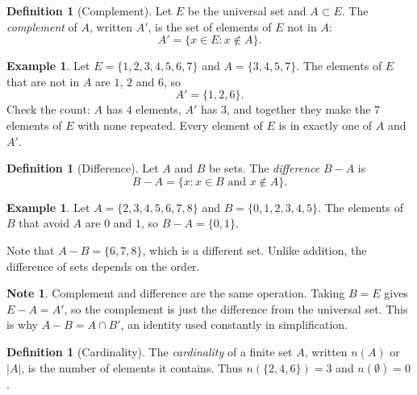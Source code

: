\documentclass[11pt,a4paper]{article}
\theoremstyle{definition}
\newtheorem{definition}[thm]{Definition}
\newtheorem{example}[thm]{Example}
\newtheorem{note}[thm]{Note}
\begin{document}
\begin{figure}[H]
\centering
{}
\end{figure}

\begin{definition}[Complement]
Let $E$ be the universal set and $A\subset E$. The \emph{complement} of $A$,
written $A'$, is the set of elements of $E$ not in $A$:
$$A'=\{x\in E : x\notin A\}.$$
\end{definition}

\begin{example}
Let $E=\{1,2,3,4,5,6,7\}$ and $A=\{3,4,5,7\}$. The elements of $E$ that are not in
$A$ are $1$, $2$ and $6$, so
$$A'=\{1,2,6\}.$$
Check the count: $A$ has $4$ elements, $A'$ has $3$, and together they make the
$7$ elements of $E$ with none repeated. Every element of $E$ is in exactly one of
$A$ and $A'$.
\end{example}

\begin{definition}[Difference]
Let $A$ and $B$ be sets. The \emph{difference} $B-A$ is
$$B-A=\{x : x\in B \text{ and } x\notin A\}.$$
\end{definition}

\begin{example}
Let $A=\{2,3,4,5,6,7,8\}$ and $B=\{0,1,2,3,4,5\}$. The elements of $B$ that avoid
$A$ are $0$ and $1$, so $B-A=\{0,1\}$.

Note that $A-B=\{6,7,8\}$, which is a different set. Unlike addition, the
difference of sets depends on the order.
\end{example}

\begin{note}
Complement and difference are the same operation. Taking $B=E$ gives
$E-A=A'$, so the complement is just the difference from the universal set. This is
why $A-B=A\cap B'$, an identity used constantly in simplification.
\end{note}

\begin{definition}[Cardinality]
The \emph{cardinality} of a finite set $A$, written $n(A)$ or $\left|A\right|$, is
the number of elements it contains. Thus $n(\{2,4,6\})=3$ and $n(\emptyset)=0$.
\end{definition}
\end{document}
